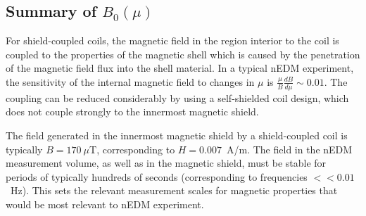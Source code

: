 \subsection{Summary of $B_0(\mu)$ \label{sec:theory_summary}}

For shield-coupled coils, the magnetic field in the region interior to
the coil is coupled to the properties of the magnetic shell which is
caused by the penetration of the magnetic field flux into the shell
material. In a typical nEDM experiment, the sensitivity of the
internal magnetic field to changes in $\mu$ is
$\frac{\mu}{B}\frac{dB}{d\mu}\sim 0.01$.  The coupling can be reduced
considerably by using a self-shielded coil design, which does not
couple strongly to the innermost magnetic shield.

The field generated in the innermost magnetic shield by a
shield-coupled coil is typically $B=170~\mu$T, corresponding to
$H=0.007$~A/m.  The field in the nEDM measurement volume, as well as
in the magnetic shield, must be stable for periods of typically
hundreds of seconds (corresponding to frequencies $<<0.01$~Hz).  This
sets the relevant measurement scales for magnetic properties that
would be most relevant to nEDM experiment.
